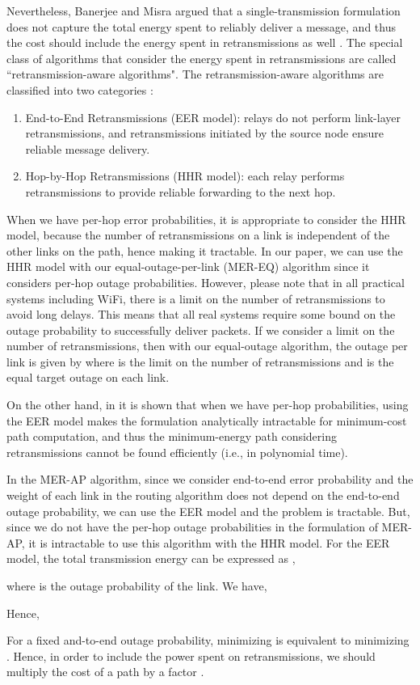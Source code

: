 \documentclass[10pt,journal]{IEEEtran}
\theoremstyle{definition}
\begin{document}
	{Nevertheless, Banerjee and Misra argued that a single-transmission
	formulation does not capture the total energy
	spent to reliably deliver a message, and thus the cost should include the energy spent in retransmissions as well \cite{banerjee2002minimum}.
	The special class of algorithms that consider the energy spent in retransmissions  are called ``retransmission-aware algorithms".
	The retransmission-aware algorithms are classified into two categories \cite{banerjee2002minimum}:
	\begin{enumerate}
		\item 
		End-to-End Retransmissions (EER model): relays do not perform link-layer retransmissions, and 
		retransmissions initiated by the source node ensure reliable message delivery.
		\item
		Hop-by-Hop Retransmissions (HHR model): each relay performs retransmissions to provide reliable
		forwarding to the next hop.
	\end{enumerate}
	When we have per-hop error probabilities, it is appropriate to consider the HHR model, because the number of retransmissions on a link is independent of the other links on the path,  hence making it tractable. 
In our paper, we can use the HHR model with our 
	equal-outage-per-link (MER-EQ) algorithm since it considers per-hop outage probabilities.
	However, please note that  in all practical systems including 
	WiFi, there is a limit on the number of retransmissions to avoid long 
	delays. This means that all real systems require some bound on the 
	outage probability to successfully deliver packets. 
If we consider a limit on the number of retransmissions, then with our 
	equal-outage algorithm, the outage per link is given by  
	where  is the limit on the number of retransmissions and  is the 
	equal target outage on each link.}
	
	{On the other hand, in \cite{banerjee2002minimum,banerjee2004energy} it is shown that  when we have per-hop probabilities, using the EER model makes the formulation analytically intractable for  minimum-cost path computation, and thus the minimum-energy path considering retransmissions cannot be found efficiently (i.e., in polynomial time).}
	
	{In  the MER-AP algorithm, since we consider end-to-end error probability and the weight of each link in the routing algorithm does not depend on the end-to-end outage probability, we can use the EER model and  the problem is 	tractable. 
	But, since we do not have the per-hop outage probabilities  in the formulation of MER-AP, it is intractable  to use this algorithm with the HHR model. 
	For the EER model, the total transmission energy can be expressed as \cite{banerjee2002minimum},
	
	where  is the outage probability of the  link. We have,
	 
	Hence,
	
	For a fixed and-to-end outage probability, minimizing  is equivalent to minimizing . Hence,
	in order to include the power spent on retransmissions, we should multiply the cost of a path by a factor .
	}
\end{document}
